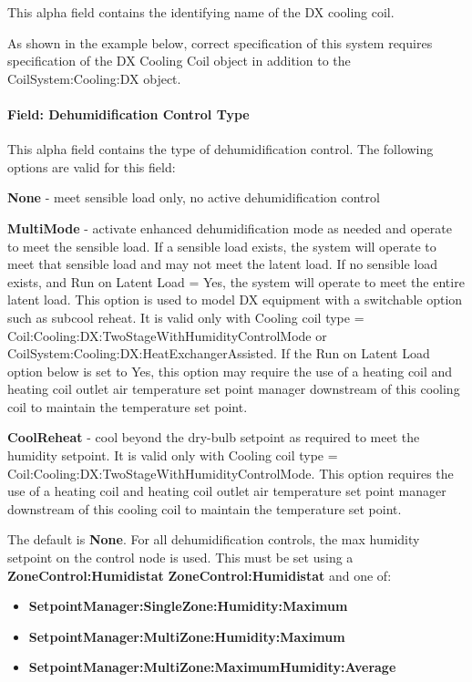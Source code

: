 This alpha field contains the identifying name of the DX cooling coil.

As shown in the example below, correct specification of this system requires specification of the DX Cooling Coil object in addition to the CoilSystem:Cooling:DX object.

\paragraph{Field: Dehumidification Control Type}\label{field-dehumidification-control-type}

This alpha field contains the type of dehumidification control. The following options are valid for this field:

\textbf{None} - meet sensible load only, no active dehumidification control

\textbf{MultiMode} - activate enhanced dehumidification mode as needed and operate to meet the sensible load. If a sensible load exists, the system will operate to meet that sensible load and may not meet the latent load. If no sensible load exists, and Run on Latent Load = Yes, the system will operate to meet the entire latent load. This option is used to model DX equipment with a switchable option such as subcool reheat. It is valid only with Cooling coil type = Coil:Cooling:DX:TwoStageWithHumidityControlMode or CoilSystem:Cooling:DX:HeatExchangerAssisted. If the Run on Latent Load option below is set to Yes, this option may require the use of a heating coil and heating coil outlet air temperature set point manager downstream of this cooling coil to maintain the temperature set point.

\textbf{CoolReheat} - cool beyond the dry-bulb setpoint as required to meet the humidity setpoint. It is valid only with Cooling coil type = Coil:Cooling:DX:TwoStageWithHumidityControlMode. This option requires the use of a heating coil and heating coil outlet air temperature set point manager downstream of this cooling coil to maintain the temperature set point.

The default is \textbf{None}. For all dehumidification controls, the max humidity setpoint on the control node is used. This must be set using a \textbf{ZoneControl:Humidistat} \textbf{ZoneControl:Humidistat} and one of:

\begin{itemize}
\item
  \textbf{SetpointManager:SingleZone:Humidity:Maximum}
\item
  \textbf{SetpointManager:MultiZone:Humidity:Maximum}
\item
  \textbf{SetpointManager:MultiZone:MaximumHumidity:Average}
\end{itemize}

